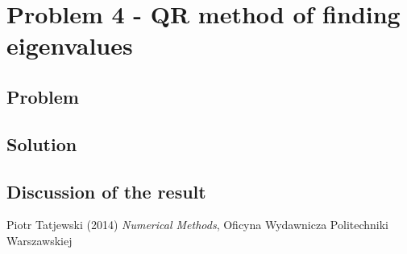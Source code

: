 \documentclass{report}
\begin{document}
\chapter{Problem 4 - QR method of finding eigenvalues}

\section{Problem}

\section{Solution}

\section{Discussion of the result}

\begin{thebibliography}{9}
Piotr Tatjewski (2014) \emph{Numerical Methods}, Oficyna Wydawnicza Politechniki Warszawskiej
\end{thebibliography}
\end{document}
